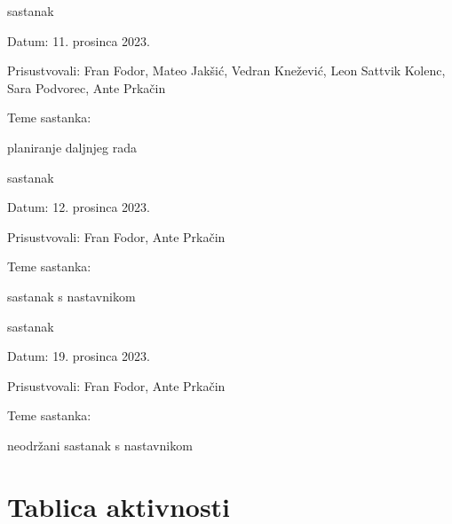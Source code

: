 \begin{packed_enum}
			\item  sastanak
			\item[] \begin{packed_item}
				\item Datum: {11. prosinca 2023.}
				\item Prisustvovali: {Fran Fodor, Mateo Jakšić, Vedran Knežević, Leon Sattvik Kolenc, Sara Podvorec, Ante Prkačin}
				\item Teme sastanka:
				\begin{packed_item}
					\item  planiranje daljnjeg rada
				\end{packed_item}
			\end{packed_item}

			\item  sastanak
			\item[] \begin{packed_item}
				\item Datum: {12. prosinca 2023.}
				\item Prisustvovali: {Fran Fodor, Ante Prkačin}
				\item Teme sastanka:
				\begin{packed_item}
					\item  sastanak s nastavnikom
				\end{packed_item}
			\end{packed_item}

			\item  sastanak
			\item[] \begin{packed_item}
				\item Datum: {19. prosinca 2023.}
				\item Prisustvovali: {Fran Fodor, Ante Prkačin}
				\item Teme sastanka:
				\begin{packed_item}
					\item  neodržani sastanak s nastavnikom
				\end{packed_item}
			\end{packed_item}

			
		\end{packed_enum}
		
		\eject
		\section*{Tablica aktivnosti}
		
